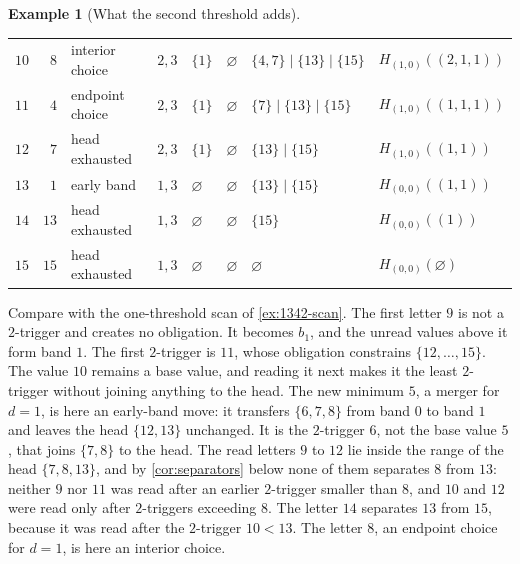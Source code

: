 \documentclass[11pt,reqno]{amsart}
\theoremstyle{definition}
\newtheorem{example}[example]{Example}
\theoremstyle{remark}
\begin{document}
\begin{example}[What the second threshold adds]
\begin{center}
\begin{tabular}{@{}rrllllll@{}}
$10$ & $8$ & interior choice & $2,3$ & $\{1\}$ & $\varnothing$ & $\{4,7\}\mid\{13\}\mid\{15\}$ & $H_{(1,0)}((2,1,1))$ \\
$11$ & $4$ & endpoint choice & $2,3$ & $\{1\}$ & $\varnothing$ & $\{7\}\mid\{13\}\mid\{15\}$ & $H_{(1,0)}((1,1,1))$ \\
$12$ & $7$ & head exhausted & $2,3$ & $\{1\}$ & $\varnothing$ & $\{13\}\mid\{15\}$ & $H_{(1,0)}((1,1))$ \\
$13$ & $1$ & early band & $1,3$ & $\varnothing$ & $\varnothing$ & $\{13\}\mid\{15\}$ & $H_{(0,0)}((1,1))$ \\
$14$ & $13$ & head exhausted & $1,3$ & $\varnothing$ & $\varnothing$ & $\{15\}$ & $H_{(0,0)}((1))$ \\
$15$ & $15$ & head exhausted & $1,3$ & $\varnothing$ & $\varnothing$ & $\varnothing$ & $H_{(0,0)}(\varnothing)$ \\
\bottomrule
\end{tabular}
\end{center}
Compare with the one-threshold scan of \cref{ex:1342-scan}.  The first
letter $9$ is not a $2$-trigger and creates no obligation.  It becomes
$b_1$, and the unread values above it form band $1$.  The first
$2$-trigger is $11$, whose obligation constrains $\{12,\ldots,15\}$.  The
value $10$ remains a base value, and reading it next makes it the least
$2$-trigger without joining anything to the head.  The new minimum $5$, a merger for
$d=1$, is here an early-band move: it transfers $\{6,7,8\}$ from band $0$
to band $1$ and leaves the head $\{12,13\}$ unchanged.  It is the
$2$-trigger $6$, not the base value $5$, that joins $\{7,8\}$ to the
head.  The read letters $9$ to $12$ lie inside the range of the head
$\{7,8,13\}$, and by \cref{cor:separators} below none of them separates $8$
from $13$: neither $9$ nor $11$ was read after an earlier $2$-trigger smaller
than $8$, and $10$ and $12$ were read only after $2$-triggers exceeding $8$.
The letter $14$ separates $13$ from $15$, because it was read after the
$2$-trigger $10<13$.  The letter $8$, an endpoint
choice for $d=1$, is here an interior choice.


\end{example}
\end{document}
